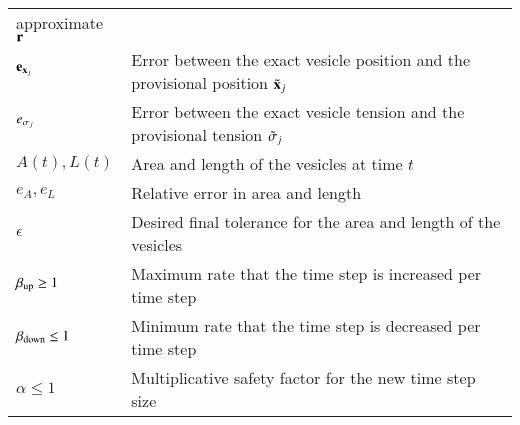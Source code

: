 \begin{table}[htp]
{\begin{tabular}{|l|l|}
                              approximate ${\mathbf{r}}$ \\
${\mathbf{e}_{{\mathbf{x}}_{j}}}$                   & Error between the exact vesicle position and
                              the provisional position ${\tilde{{\mathbf{x}}}_{j}}$  \\
${e_{\sigma_{j}}}$                & Error between the exact vesicle tension and
                              the provisional tension ${\tilde{\sigma}_{j}}$  \\
$A(t),L(t)$                 & Area and length of the vesicles at time 
                              $t$ \\
$e_{A},e_{L}$               & Relative error in area and length \\
$\epsilon$                  & Desired final tolerance for the area and 
                              length of the vesicles \\
$\beta_{{\mathrm{up}}} \geq 1$        & Maximum rate that the time step is
increased per time step \\
$\beta_{{\mathrm{down}}} \leq 1$      & Minimum rate that the time step is
decreased per time step \\
$\alpha \leq 1$             & Multiplicative safety factor for the new
                              time step size \\
\hline
\end{tabular}
}
\end{table}

